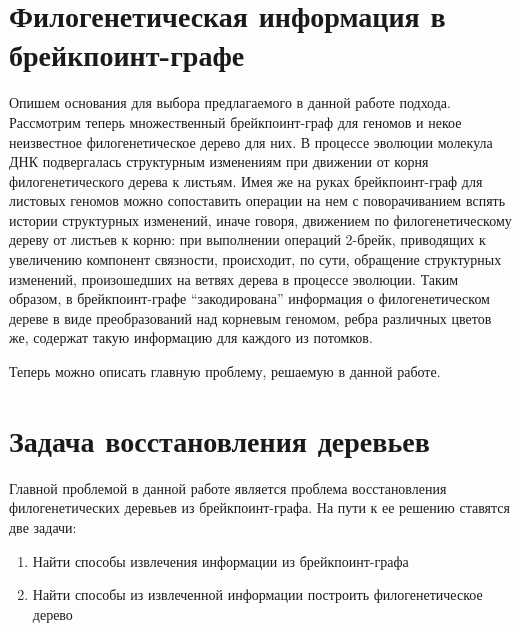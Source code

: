 \section{Филогенетическая информация в брейкпоинт-графе}

Опишем основания для выбора предлагаемого в данной работе подхода.
Рассмотрим теперь множественный брейкпоинт-граф для геномов и некое неизвестное филогенетическое дерево для них.
В процессе эволюции молекула ДНК подвергалась структурным изменениям при движении от корня филогенетического дерева к листьям.
Имея же на руках брейкпоинт-граф для листовых геномов можно сопоставить операции на нем с поворачиванием вспять истории структурных изменений,
иначе говоря, движением по филогенетическому дереву от листьев к корню:
при выполнении операций 2-брейк, приводящих к увеличению компонент связности, происходит, по сути, обращение структурных изменений,
произошедших на ветвях дерева в процессе эволюции.
Таким образом, в брейкпоинт-графе ``закодирована'' информация о филогенетическом дереве в виде преобразований над корневым геномом,
ребра различных цветов же, содержат такую информацию для каждого из потомков.

Теперь можно описать главную проблему, решаемую в данной работе.

\section{Задача восстановления деревьев}
Главной проблемой в данной работе является проблема восстановления филогенетических деревьев из брейкпоинт-графа.
На пути к ее решению ставятся две задачи:
\begin{enumerate}
  \item Найти способы извлечения информации из брейкпоинт-графа
  \item Найти способы из извлеченной информации построить филогенетическое дерево
\end{enumerate}
